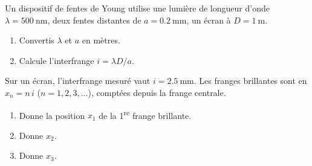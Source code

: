 \documentclass[11pt,a4paper]{article}
\begin{document}
\begin{exo}
Un dispositif de fentes de Young utilise une lumière de longueur d'onde
$\lambda=\SI{500}{\nano\metre}$, deux fentes distantes de $a=\SI{0.2}{\milli\metre}$, un écran à
$D=\SI{1}{\metre}$.
\begin{enumerate}[label=\alph*)]
  \item Convertis $\lambda$ et $a$ en mètres.
  \item Calcule l'interfrange $i=\lambda D/a$.
\end{enumerate}
\end{exo}

\begin{exo}
Sur un écran, l'interfrange mesuré vaut $i=\SI{2.5}{\milli\metre}$. Les franges brillantes sont
en $x_n=n\,i$ ($n=1,2,3,\dots$), comptées depuis la frange centrale.
\begin{enumerate}[label=\alph*)]
  \item Donne la position $x_1$ de la 1\textsuperscript{re} frange brillante.
  \item Donne $x_2$.
  \item Donne $x_3$.
\end{enumerate}
\end{exo}
\end{document}
